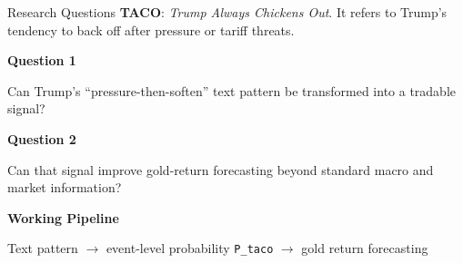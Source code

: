 \begin{frame}{Research Questions}
  \normalsize
  \small
  \textbf{TACO}: \emph{Trump Always Chickens Out}. It refers to Trump's tendency to back off after pressure or tariff threats.

  \vspace{0.7em}
  \normalsize
  {\bfseries\normalsize Question 1}\par
  \vspace{0.1em}
  \normalsize
  Can Trump's ``pressure-then-soften'' text pattern be transformed into a tradable signal?

  \vspace{0.8em}
  {\bfseries\normalsize Question 2}\par
  \vspace{0.1em}
  Can that signal improve gold-return forecasting beyond standard macro and market information?

  \vfill
  {\color{orange!90!black}\bfseries\normalsize Working Pipeline}\par
  \vspace{0.1em}
  \small
  Text pattern $\rightarrow$ event-level probability \texttt{P\_taco} $\rightarrow$ gold return forecasting
\end{frame}
